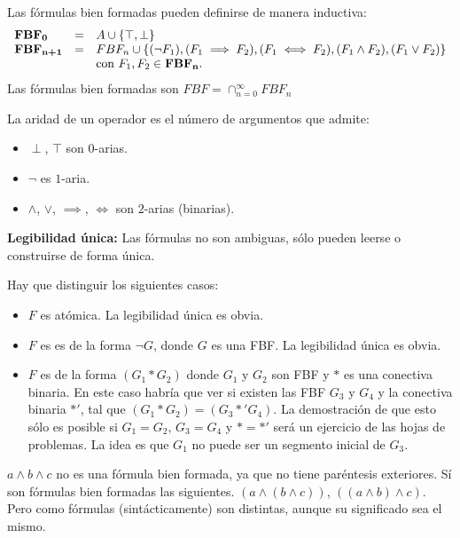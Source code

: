 \noindent Las fórmulas bien formadas pueden definirse de manera inductiva:
\begin{equation*}
\begin{array}{l l l}
	\textbf{FBF}_\textbf{0} &=& A\cup\{\top, \perp \}\\
	\textbf{FBF}_\textbf{n+1} &=& FBF_n \cup \{(\neg F_1), (F_1\implies F_2),(F_1\iff F_2),(F_1\wedge F_2),(F_1\vee F_2)\}\\ &&\text{con } F_1,F_2\in \textbf{FBF}_\textbf{n}.
\end{array}
\end{equation*}
Las fórmulas bien formadas son $FBF=\cap_{n=0}^\infty FBF_n$

\begin{defn}[Aridad]
	La aridad de un operador es el número de argumentos que admite:
	\begin{itemize}
		\item $\perp$, $\top$ son $0$-arias.
		\item $\neg$ es $1$-aria.
		\item $\wedge$, $\vee$, $\implies$, $\iff$ son $2$-arias (binarias).
	\end{itemize}
\end{defn}

\begin{lemma}{\textbf{Legibilidad única:}}
	Las fórmulas no son ambiguas, sólo pueden leerse o construirse de forma única.
\end{lemma}
Hay que distinguir los siguientes casos:
\begin{itemize}
	\item $F$ es atómica. La legibilidad única es obvia.
	\item $F$ es es de la forma $\neg G$, donde $G$ es una FBF. La legibilidad única es obvia.
	\item $F$ es de la forma $(G_1\ast G_2)$ donde $G_1$ y $G_2$ son FBF y $\ast$ es una conectiva binaria. En este caso habría que ver si existen las FBF $G_3$ y $G_4$ y la conectiva binaria $\ast'$, tal que $(G_1\ast G_2) = (G_3\ast ' G_4)$. La demostración de que esto sólo es posible si $G_1=G_2$, $G_3=G_4$ y $\ast = \ast'$ será un ejercicio de las hojas de problemas. La idea es que $G_1$ no puede ser un segmento inicial de $G_3$.
\end{itemize}

\begin{obs}
	$a\wedge b \wedge c$ no es una fórmula bien formada, ya que no tiene paréntesis exteriores. Sí son fórmulas bien formadas las siguientes. $(a\wedge (b\wedge c))$, $((a\wedge b) \wedge c)$. Pero como fórmulas (sintácticamente) son distintas, aunque su significado sea el mismo.
\end{obs}

